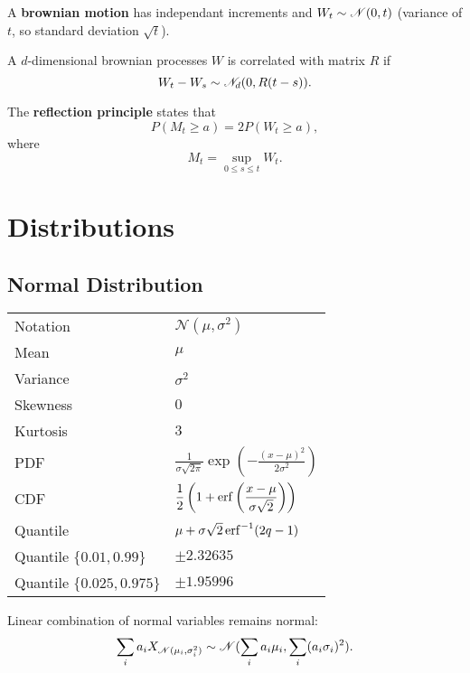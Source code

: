 \begin{outline}
  \1 A \textbf{brownian motion} has independant increments and $W_t \sim \mathscr{N}(0,t)$
  (variance of $t$, so standard deviation $\sqrt{t}$).

  \1 A $d$-dimensional brownian processes $W$ is correlated with matrix $R$ if
  \[
    W_t - W_s \sim \mathscr{N}_d(0, R(t-s)).
  \]


  \1 The \textbf{reflection principle} states that 
  \[
    P(M_t \geq a) = 2P(W_t \geq a),
  \]
  where 
  \[
    M_t = \sup_{0\leq s \leq t} W_t.
  \]
\end{outline}

\section{Distributions}

\subsection{Normal Distribution}

\begin{center}
\begin{tabular}{ll} \toprule
  Notation & $\mathscr{N}(\mu,\sigma^2)$\\
  Mean & $\mu$\\
  Variance & $\sigma^2$\\
  Skewness & $0$\\
  Kurtosis & $3$\\
  PDF & $\displaystyle
        \frac{1}{\sigma\sqrt{2\pi}}\exp\left(-\frac{(x-\mu)^2}{2\sigma^2}\right)$\\
  CDF & $\displaystyle
        \frac{1}{2}\left(1+\operatorname{erf}\left(\frac{x-\mu}{\sigma\sqrt{2}}\right)\right)$\\
  Quantile & $\mu + \sigma\sqrt{2}\operatorname{erf}^{-1}(2q-1)$\\
  Quantile $\{0.01,0.99\}$ & $\pm 2.32635$\\
  Quantile $\{0.025,0.975\}$ & $\pm 1.95996$\\
  \bottomrule
\end{tabular}
\end{center}

\begin{outline}
  \1 Linear combination of normal variables remains normal:
  \[
    \sum_i a_i X_{\mathscr{N}(\mu_i,\sigma^2_i)} \sim \mathscr{N}(\sum_ia_i\mu_i,\sum_i(a_i \sigma_i)^2).
  \]
\end{outline}

